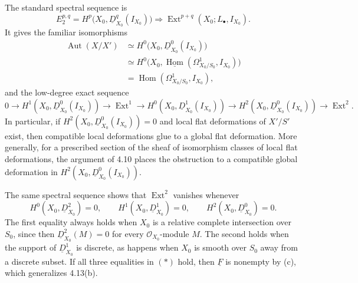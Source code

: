 The standard spectral sequence is
\[
E_2^{p,q}
=H^p\bigl(X_0,\underline D^q_{X_0}(I_{X_0})\bigr)
\Longrightarrow
\operatorname{Ext}^{p+q}(X_0;L_\bullet,I_{X_0}).
\]
It gives the familiar isomorphisms
\begin{align*}
\operatorname{Aut}(X/X')
&\simeq H^0\bigl(X_0,\underline D^0_{X_0}(I_{X_0})\bigr)\\
&\simeq H^0\bigl(X_0,
  \underline{\operatorname{Hom}}
  (\Omega^1_{X_0/S_0},I_{X_0})\bigr)\\
&=\operatorname{Hom}(\Omega^1_{X_0/S_0},I_{X_0}),
\end{align*}
and the low-degree exact sequence
\[
0\longrightarrow H^1(X_0,\underline D^0_{X_0}(I_{X_0}))
\longrightarrow\operatorname{Ext}^1
\longrightarrow H^0(X_0,\underline D^1_{X_0}(I_{X_0}))
\longrightarrow H^2(X_0,\underline D^0_{X_0}(I_{X_0}))
\longrightarrow\operatorname{Ext}^2.
\]
In particular, if
$H^2(X_0,\underline D^0_{X_0}(I_{X_0}))=0$ and local flat
deformations of $X'/S'$ exist, then compatible local deformations
glue to a global flat deformation. More generally, for a prescribed
section of the sheaf of isomorphism classes of local flat
deformations, the argument of 4.10 places the obstruction to a
compatible global deformation in
$H^2(X_0,\underline D^0_{X_0}(I_{X_0}))$.


The same spectral sequence shows that $\operatorname{Ext}^2$ vanishes
whenever
\begin{equation}\tag{*}
H^0(X_0,\underline D^2_{X_0})=0,
\qquad
H^1(X_0,\underline D^1_{X_0})=0,
\qquad
H^2(X_0,\underline D^0_{X_0})=0.
\end{equation}
The first equality always holds when $X_0$ is a relative complete
intersection over $S_0$, since then
$\underline D^2_{X_0}(M)=0$ for every $\mathcal O_{X_0}$-module $M$.
The second holds when the support of $\underline D^1_{X_0}$ is
discrete, as happens when $X_0$ is smooth over $S_0$ away from a
discrete subset. If all three equalities in $(*)$ hold, then
$\underline F$ is nonempty by (c), which generalizes 4.13(b).

